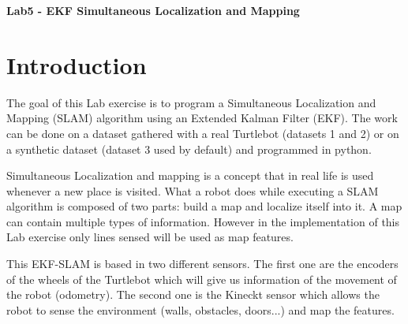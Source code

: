 \documentclass[a4paper,10pt]{article}
\begin{document}
\marginsize{2cm}{2cm}{2cm}{2cm}

\begin{center}
\Large \textbf{Lab5 - EKF Simultaneous Localization and Mapping}
\end{center}

\section{Introduction}
The goal of this Lab exercise is to program a Simultaneous Localization and Mapping (SLAM) algorithm using an Extended Kalman Filter (EKF). The work can be done on a dataset gathered with a real Turtlebot (datasets 1 and 2) or on a synthetic dataset (dataset 3 used by default) and programmed in python.

Simultaneous Localization and mapping is a concept that in real life is used whenever a new place is visited. What a robot does while executing a SLAM algorithm is composed of two parts: build a map and localize itself into it. A map can contain multiple types of information. However in the implementation of this Lab exercise only lines sensed will be used as map features.

This EKF-SLAM is based in two different sensors. The first one are the encoders of the wheels of the Turtlebot which will give us information of the movement of the robot (odometry). The second one is the Kineckt sensor which allows the robot to sense the environment (walls, obstacles, doors...) and map the features.
\end{document}
